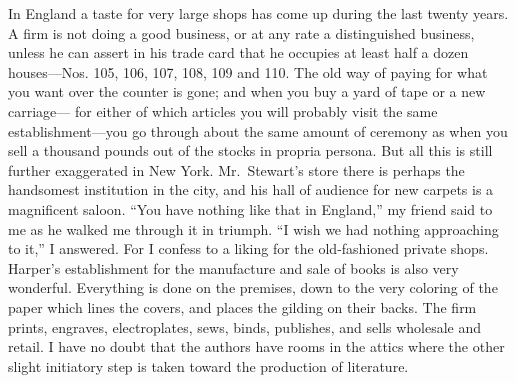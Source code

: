 In England a taste for very large shops has come up during the last
twenty years.  A firm is not doing a good business, or at any rate
a distinguished business, unless he can assert in his trade card
that he occupies at least half a dozen houses---Nos. 105, 106, 107,
108, 109 and 110.  The old way of paying for what you want over the
counter is gone; and when you buy a yard of tape or a new carriage---%
for either of which articles you will probably visit the same
establishment---you go through about the same amount of ceremony as
when you sell a thousand pounds out of the stocks in propria
persona.  But all this is still further exaggerated in New York.
Mr.\ Stewart's store there is perhaps the handsomest institution in
the city, and his hall of audience for new carpets is a magnificent
saloon.  ``You have nothing like that in England,'' my friend said to
me as he walked me through it in triumph.  ``I wish we had nothing
approaching to it,'' I answered.  For I confess to a liking for the
old-fashioned private shops.  Harper's establishment for the
manufacture and sale of books is also very wonderful.  Everything
is done on the premises, down to the very coloring of the paper
which lines the covers, and places the gilding on their backs.  The
firm prints, engraves, electroplates, sews, binds, publishes, and
sells wholesale and retail.  I have no doubt that the authors have
rooms in the attics where the other slight initiatory step is taken
toward the production of literature.


